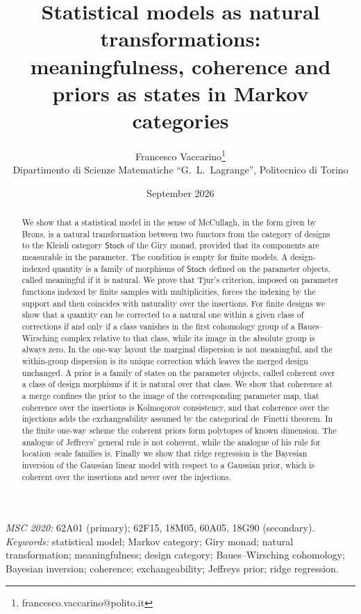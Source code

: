 \documentclass[11pt,a4paper]{article}
\title{Statistical models as natural transformations:\\
meaningfulness, coherence and priors as states in Markov categories}
\author{Francesco Vaccarino\footnote{francesco.vaccarino@polito.it}\\
\small Dipartimento di Scienze Matematiche ``G.\ L.\ Lagrange'', Politecnico di Torino}
\date{September 2026}
\theoremstyle{plain}
\theoremstyle{definition}
\theoremstyle{remark}
\newcommand{\cat}[1]{\mathsf{#1}}
\newcommand{\Stoch}{\cat{Stoch}}
\begin{document}
\maketitle

\begin{abstract}
\noindent
We show that a statistical model in the sense of McCullagh, in the form given
by Br\o ns, is a natural transformation between two functors from the category
of designs to the Kleisli category $\Stoch$ of the Giry monad, provided that
its components are measurable in the parameter. The condition is empty for
finite models. A design-indexed quantity is
a family of morphisms of $\Stoch$ defined on the parameter objects, called
meaningful if it is natural. We prove that Tjur's criterion, imposed on
parameter functions indexed by finite samples with multiplicities, forces the
indexing by the support and then coincides with naturality over the
insertions. For finite designs we show that a quantity
can be corrected to a natural one within a given class of corrections if and
only if a class vanishes in the first cohomology group of a Baues--Wirsching
complex relative to that class, while its image in the absolute group is
always zero. In the one-way layout the marginal dispersion is not meaningful,
and the within-group dispersion is its unique correction which leaves the
merged design unchanged. A prior is a family of states on the parameter
objects, called coherent over a class of design morphisms if it is natural
over that class. We show that coherence at a merge confines the prior
to the image of the corresponding parameter map, that coherence over the
insertions is Kolmogorov consistency, and that coherence over the injections
adds the exchangeability assumed by the categorical de~Finetti theorem. In the
finite one-way scheme the coherent priors form polytopes of known dimension. The analogue of Jeffreys' general rule is not coherent, while the
analogue of his rule for location--scale families is. Finally we show that
ridge regression is the Bayesian inversion of the Gaussian linear model with
respect to a Gaussian prior, which is coherent over the insertions and never
over the injections.
\end{abstract}

\medskip
\noindent\emph{MSC 2020:} 62A01 (primary); 62F15, 18M05, 60A05, 18G90 (secondary).\\
\emph{Keywords:} statistical model; Markov category; Giry monad; natural
transformation; meaningfulness; design category; Baues--Wirsching cohomology;
Bayesian inversion; coherence; exchangeability; Jeffreys prior; ridge
regression.
\end{document}
